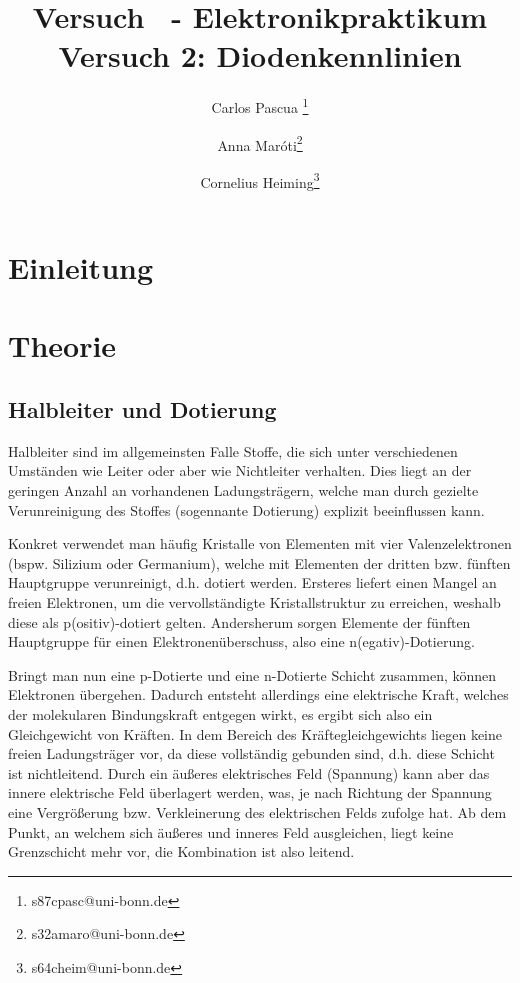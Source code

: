 \documentclass{article}
\title{Versuch \nummer~-  \titel}
\date{\datum}
\theoremstyle{definition}
\begin{document}
    \title{Elektronikpraktikum \\ \textbf{Versuch 2: Diodenkennlinien}}
    \author[1]{Carlos Pascua \thanks{s87cpasc@uni-bonn.de}}
    \author[1]{Anna Maróti\thanks{s32amaro@uni-bonn.de}}
    \author[1]{Cornelius Heiming\thanks{s64cheim@uni-bonn.de}}
    \begin{titlepage}
     \maketitle   
    \end{titlepage}
        
\tableofcontents
\newpage
{}

\pagestyle{fancy}
\fancyhead[R]{\thepage}
\fancyhead[L]{\leftmark}

\section{Einleitung}

\section{Theorie}
    \subsection{Halbleiter und Dotierung}
    Halbleiter sind im allgemeinsten Falle Stoffe, die sich unter verschiedenen Umständen wie Leiter oder aber wie Nichtleiter verhalten. Dies liegt an der geringen Anzahl an vorhandenen Ladungsträgern, welche man durch gezielte Verunreinigung des Stoffes (sogennante Dotierung) explizit beeinflussen kann. 

    Konkret verwendet man häufig Kristalle von Elementen mit vier Valenzelektronen (bspw. Silizium oder Germanium), welche mit Elementen der dritten bzw. fünften Hauptgruppe verunreinigt, d.h. dotiert werden. Ersteres liefert einen Mangel an freien Elektronen, um die vervollständigte Kristallstruktur zu erreichen, weshalb diese als p(ositiv)-dotiert gelten. Andersherum sorgen Elemente der fünften Hauptgruppe für einen Elektronenüberschuss, also eine n(egativ)-Dotierung.

    Bringt man nun eine p-Dotierte und eine n-Dotierte Schicht zusammen, können Elektronen übergehen. Dadurch entsteht allerdings eine elektrische Kraft, welches der molekularen Bindungskraft entgegen wirkt, es ergibt sich also ein Gleichgewicht von Kräften. In dem Bereich des Kräftegleichgewichts liegen keine freien Ladungsträger vor, da diese vollständig gebunden sind, d.h. diese Schicht ist nichtleitend. Durch ein äußeres elektrisches Feld (Spannung) kann aber das innere elektrische Feld überlagert werden, was, je nach Richtung der Spannung eine Vergrößerung bzw. Verkleinerung des elektrischen Felds zufolge hat. Ab dem Punkt, an welchem sich äußeres und inneres Feld ausgleichen, liegt keine Grenzschicht mehr vor, die Kombination ist also leitend.  
\end{document}
